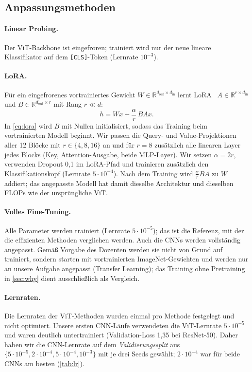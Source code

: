 \subsection{Anpassungsmethoden}
\label{sec:methods}
\paragraph{Linear Probing.} Der ViT-Backbone ist eingefroren; trainiert wird nur der neue lineare
Klassifikator auf dem \texttt{[CLS]}-Token (Lernrate $10^{-3}$).

\paragraph{LoRA.} Für ein eingefrorenes vortrainiertes Gewicht $W\in\mathbb{R}^{d_\text{out}\times
d_\text{in}}$ lernt LoRA~\cite{hu2022lora} $A\in\mathbb{R}^{r\times d_\text{in}}$ und
$B\in\mathbb{R}^{d_\text{out}\times r}$ mit Rang $r\ll d$:
\begin{equation}
  h = W x + \frac{\alpha}{r}\, B A x .
  \label{eq:lora}
\end{equation}
In \cref{eq:lora} wird $B$ mit Nullen initialisiert, sodass das Training beim vortrainierten Modell
beginnt. Wir passen die Query- und Value-Projektionen aller 12 Blöcke mit $r\in\{4,8,16\}$ an und für
$r=8$ zusätzlich alle linearen Layer jedes Blocks (Key, Attention-Ausgabe, beide MLP-Layer). Wir setzen
$\alpha=2r$, verwenden Dropout 0,1 im LoRA-Pfad und trainieren zusätzlich den Klassifikationskopf (Lernrate
$5\cdot10^{-4}$). Nach dem Training wird $\frac{\alpha}{r}BA$ zu $W$ addiert; das angepasste Modell hat
damit dieselbe Architektur und dieselben FLOPs wie der ursprüngliche ViT.

\paragraph{Volles Fine-Tuning.} Alle Parameter werden trainiert (Lernrate $5\cdot10^{-5}$); das ist die
Referenz, mit der die effizienten Methoden verglichen werden. Auch die CNNs werden vollständig
angepasst. Gemäß Vorgabe des Dozenten werden sie nicht von Grund auf trainiert, sondern starten mit vortrainierten
ImageNet-Gewichten und werden nur an unsere Aufgabe angepasst (Transfer Learning); das Training ohne
Pretraining in \cref{sec:why} dient ausschließlich als Vergleich.

\paragraph{Lernraten.} Die Lernraten der ViT-Methoden wurden einmal pro Methode festgelegt und nicht
optimiert. Unsere ersten CNN-Läufe verwendeten die
ViT-Lernrate $5\cdot10^{-5}$ und waren deutlich untertrainiert (Validation-Loss 1,35 bei ResNet-50). Daher
haben wir die CNN-Lernrate auf dem \emph{Validierungssplit} aus $\{5\cdot10^{-5}, 2\cdot10^{-4},
5\cdot10^{-4}, 10^{-3}\}$ mit je drei Seeds gewählt; $2\cdot10^{-4}$ war für beide CNNs am besten
(\cref{tab:lr}).

